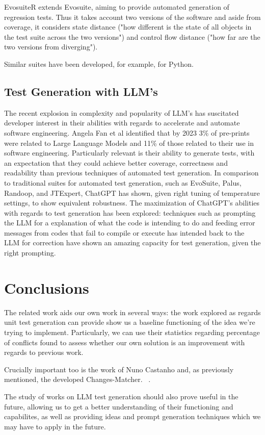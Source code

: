 EvosuiteR extends Evosuite, aiming to provide automated generation of regression tests. Thus it takes account two versions of the software and aside from coverage, it considers state distance ("how different is the state of
all objects in the test suite across the two versions") and control flow distance ("how
far are the two versions from diverging"). ~\citep{kn:evosuiter}


Similar suites have been developed, for example, for Python. ~\citep{kn:pynguin}

\subsection{Test Generation with LLM's}

The recent explosion in complexity and popularity of LLM's has suscitated developer interest in their abilities with regards to accelerate and automate software engineering. Angela Fan et al identified that by 2023 3\% of pre-prints were related to Large Language Models and 11\% of those related to their use in software engineering.\cite{kn:angela} Particularly relevant is their ability to generate tests, with an expectation that they could achieve better coverage, correctness and readability than previous techniques of automated test generation.\cite{kn:junjiewang}
In comparison to traditional suites for automated test generation, such as EvoSuite, Palus, Randoop, and JTExpert, ChatGPT has shown, given right tuning of temperature settings, to show equivalent robustness.\cite{kn:gptunitbra}
The maximization of ChatGPT's abilities with regards to test generation has been explored: techniques such as prompting the LLM for a explanation of what the code is intending to do \cite{kn:nuances} and feeding error messages from codes that fail to compile or execute has intended back to the LLM for correction \cite{kn:chattester} have shown an amazing capacity for test generation, given the right prompting.


\section{Conclusions}


The related work aids our own work in several ways: the work explored as regards unit test generation can provide show us a baseline functioning of the idea we're trying to implement. Particularly, we can use their statistics regarding percentage of conflicts found to assess whether our own solution is an improvement with regards to previous work.

Crucially important too is the work of Nuno Castanho and, as previously mentioned, the developed Changes-Matcher. ~\citep{kn:nuno}.

The study of works on LLM test generation should also prove useful in the future, allowing us to get a better understanding of their functioning and capabilites, as well as providing ideas and prompt generation techniques which we may have to apply in the future.
